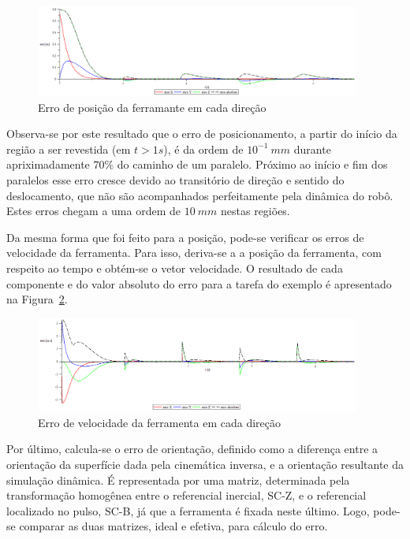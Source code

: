 \begin{figure}[h]
	\centering 
 	\includegraphics[width=0.95\textwidth]{figs/erros_exemplo}
 	\caption{Erro de posição da ferramante em cada direção}
 	\label{fig::erros_exemplo}
\end{figure}

Observa-se por este resultado que o erro de posicionamento, a partir do início
da região a ser revestida (em $t>1s$), é da ordem de $10^{-1}~mm$ durante
apriximadamente $70\%$ do caminho de um paralelo. Próximo ao início e fim dos
paralelos esse erro cresce devido ao transitório de direção e sentido do
deslocamento, que não são acompanhados perfeitamente pela dinâmica do robô.
Estes erros chegam a uma ordem de $10~mm$ nestas regiões.

Da mesma forma que foi feito para a posição, pode-se verificar os erros de
velocidade da ferramenta. Para isso, deriva-se a a posição da ferramenta, com
respeito ao tempo e obtém-se o vetor velocidade. O resultado de cada componente
e do valor absoluto do erro para a tarefa do exemplo é apresentado na
Figura~\ref{fig::errovel_exemplo}.

\begin{figure}[h]
	\centering 
 	\includegraphics[width=0.95\textwidth]{figs/errovel_exemplo}
 	\caption{Erro de velocidade da ferramenta em cada direção}
 	\label{fig::errovel_exemplo}
\end{figure}


Por último, calcula-se o erro de orientação, definido como a diferença entre a
orientação da superfície dada pela cinemática inversa, e a orientação resultante
da simulação dinâmica. 
É representada por uma matriz, determinada pela transformação homogênea entre o
referencial inercial, SC-Z, e o referencial localizado no pulso, SC-B, já que a
ferramenta é fixada neste último. Logo, pode-se comparar as duas matrizes, ideal
e efetiva, para cálculo do erro.

